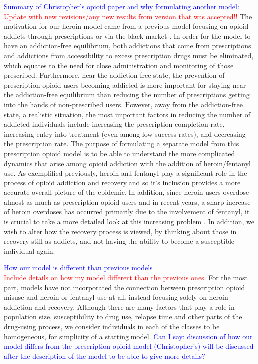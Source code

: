 \documentclass[12pt]{article}
\begin{document}
\textcolor{blue}{Summary of Christopher's opioid paper and why formulating another model:} \\
\textcolor{red}{Update with new revisions/any new results from version that was accepted!!} The motivation for our heroin model came from a previous model focusing on opioid addicts through prescriptions or via the black market \cite{Battista}. In order for the model to have an addiction-free equilibrium, both addictions that come from prescriptions and addictions from accessibility to excess prescription drugs must be eliminated, which equates to the need for close administration and monitoring of those prescribed. Furthermore, near the addiction-free state, the prevention of prescription opioid users becoming addicted is more important for staying near the addiction-free equilibrium than reducing the number of prescriptions getting into the hands of non-prescribed users. However, away from the addiction-free state, a realistic situation, the most important factors in reducing the number of addicted individuals include increasing the prescription completion rate, increasing entry into treatment (even among low success rates), and decreasing the prescription rate. The purpose of formulating a separate model from this prescription opioid model is to be able to understand the more complicated dynamics that arise among opioid addiction with the addition of heroin/fentanyl use. As exemplified previously, heroin and fentanyl play a significant role in the process of opioid addiction and recovery and so it's inclusion provides a more accurate overall picture of the epidemic. In addition, since heroin users overdose almost as much as prescription opioid users and in recent years, a sharp increase of heroin overdoses has occurred primarily due to the involvement of fentanyl, it is crucial to take a more detailed look at this increasing problem \cite{CDC4}. In addition, we wish to alter how the recovery process is viewed, by thinking about those in recovery still as addicts, and not having the ability to become a susceptible individual again. 




\textcolor{blue}{How our model is different than previous models} \\
\textcolor{red}{Include details on how my model different than the previous ones.} For the most part, models have not incorporated the connection between prescription opioid misuse and heroin or fentanyl use at all, instead focusing solely on heroin addiction and recovery. Although there are many factors that play a role in population size, susceptibility to drug use, relapse time and other parts of the drug-using process, we consider individuals in each of the classes to be homogeneous, for simplicity of a starting model. \textcolor{blue}{Can I say: discussion of how our model differs from the prescription opioid model (Christopher's) will be discussed after the description of the model to be able to give more details?}
\end{document}
